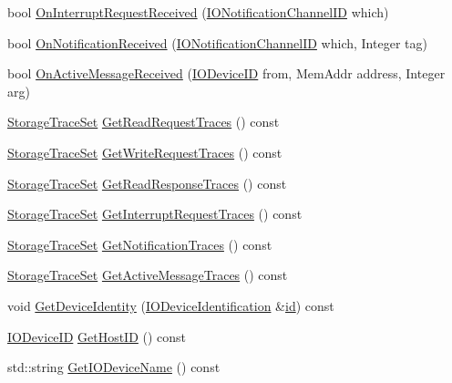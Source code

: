 \begin{DoxyCompactItemize}
bool \hyperlink{class_simulator_1_1drisc_1_1_i_o_bus_interface_a2288eb8cf7232286eaa52593e288cbc4}{On\+Interrupt\+Request\+Received} (\hyperlink{namespace_simulator_a951e1bf3ee91c11c980382a7bcbba287}{I\+O\+Notification\+Channel\+I\+D} which)
\item 
bool \hyperlink{class_simulator_1_1drisc_1_1_i_o_bus_interface_a7ee069e41b07288f93e4bab362a76b14}{On\+Notification\+Received} (\hyperlink{namespace_simulator_a951e1bf3ee91c11c980382a7bcbba287}{I\+O\+Notification\+Channel\+I\+D} which, Integer tag)
\item 
bool \hyperlink{class_simulator_1_1drisc_1_1_i_o_bus_interface_a900682cdb9ef921811b727737a5b8f7e}{On\+Active\+Message\+Received} (\hyperlink{namespace_simulator_a3493d987c866ad6b8aaa704c42502db0}{I\+O\+Device\+I\+D} from, Mem\+Addr address, Integer arg)
\item 
\hyperlink{class_simulator_1_1_storage_trace_set}{Storage\+Trace\+Set} \hyperlink{class_simulator_1_1drisc_1_1_i_o_bus_interface_ad6fb405074ccc2d41fb184cd5000ca47}{Get\+Read\+Request\+Traces} () const 
\item 
\hyperlink{class_simulator_1_1_storage_trace_set}{Storage\+Trace\+Set} \hyperlink{class_simulator_1_1drisc_1_1_i_o_bus_interface_aeda485c4fe4113a3ffdb8f36d9adac5e}{Get\+Write\+Request\+Traces} () const 
\item 
\hyperlink{class_simulator_1_1_storage_trace_set}{Storage\+Trace\+Set} \hyperlink{class_simulator_1_1drisc_1_1_i_o_bus_interface_adc9b0a20c56cbb7c7dc88e0e82b625f0}{Get\+Read\+Response\+Traces} () const 
\item 
\hyperlink{class_simulator_1_1_storage_trace_set}{Storage\+Trace\+Set} \hyperlink{class_simulator_1_1drisc_1_1_i_o_bus_interface_a73c8473be6e417f094f89c70e43df37c}{Get\+Interrupt\+Request\+Traces} () const 
\item 
\hyperlink{class_simulator_1_1_storage_trace_set}{Storage\+Trace\+Set} \hyperlink{class_simulator_1_1drisc_1_1_i_o_bus_interface_a91f1c29c4baebd5db38fb72d9fa71022}{Get\+Notification\+Traces} () const 
\item 
\hyperlink{class_simulator_1_1_storage_trace_set}{Storage\+Trace\+Set} \hyperlink{class_simulator_1_1drisc_1_1_i_o_bus_interface_aac5675b021640383f652ac9a55ebd9cf}{Get\+Active\+Message\+Traces} () const 
\item 
void \hyperlink{class_simulator_1_1drisc_1_1_i_o_bus_interface_af3fda88c51dfd7e9e253763b07c6e4bb}{Get\+Device\+Identity} (\hyperlink{struct_simulator_1_1_i_o_device_identification}{I\+O\+Device\+Identification} \&\hyperlink{mtconf_8c_aa3185401f04d30bd505daebf48c39cc5}{id}) const 
\item 
\hyperlink{namespace_simulator_a3493d987c866ad6b8aaa704c42502db0}{I\+O\+Device\+I\+D} \hyperlink{class_simulator_1_1drisc_1_1_i_o_bus_interface_a68a22584c00d2f577db565215baae2ce}{Get\+Host\+I\+D} () const 
\item 
std\+::string \hyperlink{class_simulator_1_1drisc_1_1_i_o_bus_interface_a1518e1cc93a3782515beac5c3cd13ca2}{Get\+I\+O\+Device\+Name} () const 
\end{DoxyCompactItemize}

